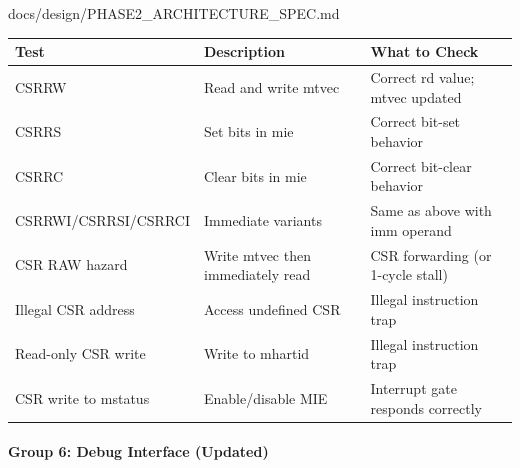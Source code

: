 \begin{relocated}{docs/design/PHASE2_ARCHITECTURE_SPEC.md}
{
\begin{longtable}[]{@{}
  >{\raggedright\arraybackslash}p{}
  >{\raggedright\arraybackslash}p{}
  >{\raggedright\arraybackslash}p{}@{}}
\toprule\noalign{}
\begin{minipage}[b]{\linewidth}\raggedright
Test
\end{minipage} & \begin{minipage}[b]{\linewidth}\raggedright
Description
\end{minipage} & \begin{minipage}[b]{\linewidth}\raggedright
What to Check
\end{minipage} \\
\midrule\noalign{}
\endhead
\bottomrule\noalign{}
\endlastfoot
CSRRW & Read and write mtvec & Correct rd value; mtvec updated \\
CSRRS & Set bits in mie & Correct bit-set behavior \\
CSRRC & Clear bits in mie & Correct bit-clear behavior \\
CSRRWI/\allowbreak{}CSRRSI/\allowbreak{}CSRRCI & Immediate variants &
Same as above with imm operand \\
CSR RAW hazard & Write mtvec then immediately read & CSR forwarding (or
1-cycle stall) \\
Illegal CSR address & Access undefined CSR & Illegal instruction trap \\
Read-only CSR write & Write to mhartid & Illegal instruction trap \\
CSR write to mstatus & Enable/\allowbreak{}disable MIE & Interrupt gate
responds correctly \\
\end{longtable}
}

\paragraph{Group 6: Debug Interface (Updated)}\label{ds:ch:phase2-architecture:group-6-debug-interface-updated}


\end{relocated}
